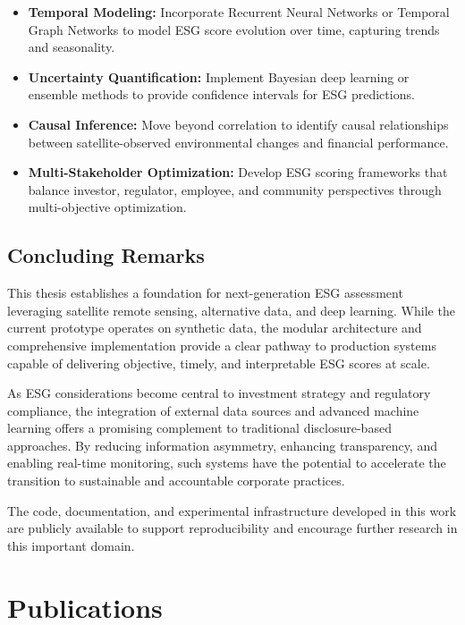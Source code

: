 \begin{itemize}
\item \textbf{Temporal Modeling:} Incorporate Recurrent Neural Networks or Temporal Graph Networks to model ESG score evolution over time, capturing trends and seasonality.
\item \textbf{Uncertainty Quantification:} Implement Bayesian deep learning or ensemble methods to provide confidence intervals for ESG predictions.
\item \textbf{Causal Inference:} Move beyond correlation to identify causal relationships between satellite-observed environmental changes and financial performance.
\item \textbf{Multi-Stakeholder Optimization:} Develop ESG scoring frameworks that balance investor, regulator, employee, and community perspectives through multi-objective optimization.
\end{itemize}

\subsection{Concluding Remarks}

This thesis establishes a foundation for next-generation ESG assessment leveraging satellite remote sensing, alternative data, and deep learning. While the current prototype operates on synthetic data, the modular architecture and comprehensive implementation provide a clear pathway to production systems capable of delivering objective, timely, and interpretable ESG scores at scale.

As ESG considerations become central to investment strategy and regulatory compliance, the integration of external data sources and advanced machine learning offers a promising complement to traditional disclosure-based approaches. By reducing information asymmetry, enhancing transparency, and enabling real-time monitoring, such systems have the potential to accelerate the transition to sustainable and accountable corporate practices.

The code, documentation, and experimental infrastructure developed in this work are publicly available to support reproducibility and encourage further research in this important domain.

\myemptypage
\section*{Publications}

